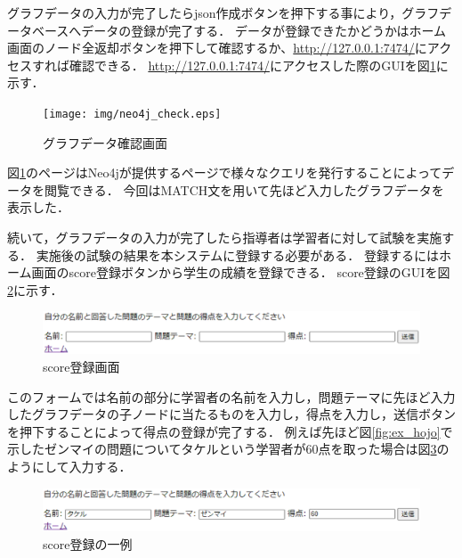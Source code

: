 \newpage

グラフデータの入力が完了したらjson作成ボタンを押下する事により，グラフデータベースへデータの登録が完了する．
データが登録できたかどうかはホーム画面のノード全返却ボタンを押下して確認するか、\url{http://127.0.0.1:7474/}にアクセスすれば確認できる．
\url{http://127.0.0.1:7474/}にアクセスした際のGUIを図\ref{fig:neo4j_check}に示す．

\begin{figure}[htbp]
\begin{center}
\texttt{[image: img/neo4j\_check.eps]}
\end{center}
\caption{グラフデータ確認画面}
\label{fig:neo4j_check}
\end{figure}
\newpage

図\ref{fig:neo4j_check}のページはNeo4jが提供するページで様々なクエリを発行することによってデータを閲覧できる．
今回はMATCH文を用いて先ほど入力したグラフデータを表示した．

続いて，グラフデータの入力が完了したら指導者は学習者に対して試験を実施する．
実施後の試験の結果を本システムに登録する必要がある．
登録するにはホーム画面のscore登録ボタンから学生の成績を登録できる．
score登録のGUIを図\ref{fig:score}に示す．

\begin{figure}[htbp]
\begin{center}
\includegraphics[width=18cm]{img/score.eps}
\end{center}
\caption{score登録画面}
\label{fig:score}
\end{figure}

このフォームでは名前の部分に学習者の名前を入力し，問題テーマに先ほど入力したグラフデータの子ノードに当たるものを入力し，得点を入力し，送信ボタンを押下することによって得点の登録が完了する．
例えば先ほど図\ref{fig:ex_hojo}で示したゼンマイの問題についてタケルという学習者が60点を取った場合は図\ref{fig:ex_score}のようにして入力する．

\begin{figure}[htbp]
\begin{center}
\includegraphics[width=18cm]{img/ex_score.eps}
\end{center}
\caption{score登録の一例}
\label{fig:ex_score}
\end{figure}
\newpage

